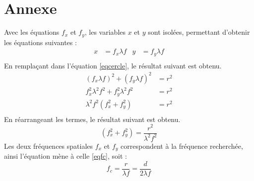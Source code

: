 \documentclass[11pt,letterpaper]{article}
\begin{document}
\newpage\section*{Annexe}
Avec les équations $f_{x}$ et $f_{y}$, les variables $x$ et $y$ sont isolées, permettant d'obtenir les équations suivantes :
\begin{align*}
  x&=f_{x}\lambda f & y&=f_{y}\lambda f \\
\end{align*}
En remplaçant dans l'équation \ref{eqcercle}, le résultat suivant est obtenu.
\begin{align*}
  (f_{x}\lambda f)^{2}+(f_{y}\lambda f)^{2}&=r^{2} \\
  f_{x}^{2}\lambda^{2}f^{2}+f_{y}^{2}\lambda^{2}f^{2}&=r^{2} \\
  \lambda^{2}f^{2}(f_{x}^{2}+f_{y}^{2})&=r^{2} \\
\end{align*}
En réarrangeant les termes, le résultat suivant est obtenu.
\begin{equation*}
  (f_{x}^{2}+f_{y}^{2})=\frac{r^{2}}{\lambda^{2}f^{2}}
\end{equation*}
Les deux fréquences spatiales $f_{x}$ et $f_{y}$ correspondent à la fréquence recherchée, ainsi l'équation mène à celle \ref{eqfc}, soit :
\begin{equation*}
  f_{c}=\frac{r}{\lambda f}=\frac{d}{2\lambda f}
\end{equation*} 

\clearpage

% 
% 
\end{document}
